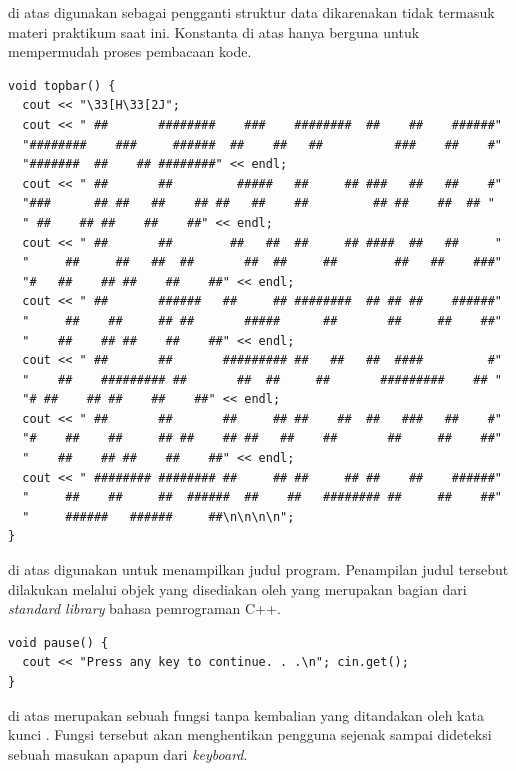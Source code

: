 \documentclass[../main.tex]{subfiles}
\begin{document}
{\Script} di atas digunakan sebagai pengganti struktur data  dikarenakan tidak termasuk materi praktikum saat ini. Konstanta di atas hanya berguna untuk mempermudah proses pembacaan kode.

\begin{code}
\begin{verbatim}
void topbar() {
  cout << "\33[H\33[2J";
  cout << " ##       ########    ###    ########  ##    ##    ######"
  "########    ###     ######  ##    ##   ##          ###    ##    #"
  "#######  ##    ## ########" << endl;
  cout << " ##       ##         #####   ##     ## ###   ##   ##    #" 
  "###      ## ##   ##    ## ##   ##    ##         ## ##    ##  ## "
  " ##    ## ##    ##    ##" << endl;
  cout << " ##       ##        ##   ##  ##     ## ####  ##   ##     "
  "     ##     ##   ##  ##       ##  ##     ##        ##   ##    ###"
  "#   ##    ## ##    ##    ##" << endl;
  cout << " ##       ######   ##     ## ########  ## ## ##    ######"
  "     ##    ##     ## ##       #####      ##       ##     ##    ##"
  "    ##    ## ##    ##    ##" << endl;
  cout << " ##       ##       ######### ##   ##   ##  ####         #"
  "    ##    ######### ##       ##  ##     ##       #########    ## "
  "# ##    ## ##    ##    ##" << endl;
  cout << " ##       ##       ##     ## ##    ##  ##   ###   ##    #"
  "#    ##    ##     ## ##    ## ##   ##    ##       ##     ##    ##"
  "    ##    ## ##    ##    ##" << endl;
  cout << " ######## ######## ##     ## ##     ## ##    ##    ######"
  "     ##    ##     ##  ######  ##    ##   ######## ##     ##    ##"
  "     ######   ######     ##\n\n\n\n";
}
\end{verbatim}
\end{code}

{\Script} di atas digunakan untuk menampilkan judul program. Penampilan judul tersebut dilakukan melalui objek  yang disediakan oleh {\header} {\file}  yang merupakan bagian dari \textit{standard library} bahasa pemrograman C++.

\begin{code}
\begin{verbatim}
void pause() {
  cout << "Press any key to continue. . .\n"; cin.get();
}
\end{verbatim}
\end{code}

{\Script} di atas merupakan sebuah fungsi tanpa kembalian yang ditandakan oleh kata kunci . Fungsi tersebut akan menghentikan pengguna sejenak sampai dideteksi sebuah masukan apapun dari \textit{keyboard}.
\end{document}
